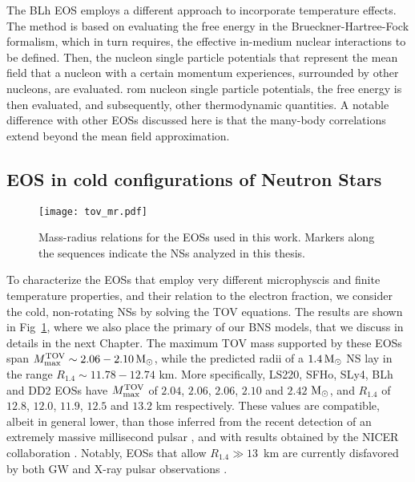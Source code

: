The BLh \ac{EOS} employs a different approach to incorporate temperature effects.
The method is based on evaluating the free energy in the Brueckner-Hartree-Fock formalism, 
which in turn requires, the effective in-medium nuclear interactions to be defined.
%
Then, the nucleon single particle potentials %
that represent the mean field that a nucleon with a certain momentum experiences, 
surrounded by other nucleons, are evaluated. 
rom nucleon single particle potentials, the free energy 
is then evaluated, and subsequently, other thermodynamic quantities. 
A notable difference 
with other \acp{EOS} discussed here is that the many-body correlations extend beyond the 
mean field approximation. %
%



\subsection{\ac{EOS} in cold configurations of Neutron Stars}


\begin{figure}[t]
    \centering 
    \texttt{[image: tov\_mr.pdf]}
    \caption{
        Mass-radius relations for the \acp{EOS} used in this work. 
        Markers along the sequences indicate the \acp{NS} analyzed in this thesis.
    }  
    \label{fig:method:tov_mr}
\end{figure}
To characterize the \acp{EOS} that employ very different microphyscis and finite 
temperature properties, and their relation to the electron fraction, we consider 
the cold, non-rotating \acp{NS} by solving the \ac{TOV} equations.
The results are shown in Fig~\ref{fig:method:tov_mr}, where we also place 
the primary of our \ac{BNS} models, that we discuss in details in the next Chapter. 
%
The maximum \ac{TOV} mass supported by these \acp{EOS} span  
$M_\text{max}^\text{TOV} \sim 2.06-2.10\,{\text{M}_{\odot}}$, while the predicted radii of a $1.4\,{\text{M}_{\odot}}$ 
\ac{NS} lay in the range $R_{1.4}\sim 11.78-12.74$ km. 
More specifically, LS220, SFHo, SLy4, BLh and DD2 \acp{EOS} have 
$M_\text{max}^\text{TOV}$ of $2.04$, $2.06$, $2.06$, $2.10$ and $2.42$ ${\text{M}_{\odot}}$, and 
$R_{1.4}$ of $12.8$, $12.0$, $11.9$, $12.5$ and $13.2$ km respectively. 
%
These values are compatible, albeit in general lower, than those inferred from the 
recent detection of an extremely massive millisecond pulsar \citep{Cromartie:2019kug},  
and with results obtained by the NICER collaboration \citep{Miller:2019cac,Riley:2019yda}.
Notably, \acp{EOS} that allow $R_{1.4}\gg 13$~km are currently disfavored by both 
\ac{GW} \GW{} and X-ray pulsar observations \citep{Abbott:2018wiz,Miller:2019cac,Riley:2019yda}.

